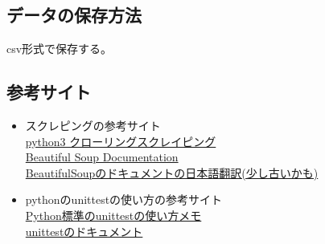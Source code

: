 \documentclass{jsarticle}
\begin{document}
  \subsection{データの保存方法}
    csv形式で保存する。

  \subsection{参考サイト}
    \begin{itemize}
      \item スクレピングの参考サイト\\
      \href{https://qiita.com/penguinz222/items/6a30d026ede2e822e245}{python3 クローリングスクレイピング}\\
      \href{https://www.crummy.com/software/BeautifulSoup/bs4/doc/}{Beautiful Soup Documentation}\\
      \href{http://kondou.com/BS4/}{BeautifulSoupのドキュメントの日本語翻訳(少し古いかも)}

      \item pythonのunittestの使い方の参考サイト\\
      \href{https://qiita.com/aomidro/items/3e3449fde924893f18ca}{Python標準のunittestの使い方メモ}\\
      \href{https://docs.python.org/ja/3/library/unittest.html}{unittestのドキュメント}\\


    \end{itemize}
\end{document}
